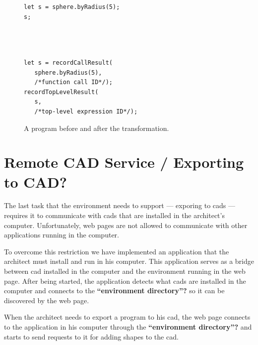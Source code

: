 \begin{figure}
  \centering
\begin{minipage}[t]{0.45\linewidth}
  \begin{verbatim}
let s = sphere.byRadius(5);
s;




  \end{verbatim}
\end{minipage}
\hspace{0.05\linewidth}
\begin{minipage}[t]{0.45\linewidth}
  \begin{verbatim}
let s = recordCallResult(
   sphere.byRadius(5),
   /*function call ID*/);
recordTopLevelResult(
   s,
   /*top-level expression ID*/);
  \end{verbatim}
\end{minipage}
  \caption{A program before and after the transformation.}
  \label{fig:instrument:example}
\end{figure}




\section{Remote CAD Service / Exporting to CAD?}
The last task that the environment needs to support --- exporing to \glspl{cad} --- requires it to communicate with \glspl{cad} that are installed in the architect's computer.
Unfortunately, web pages are not allowed to communicate with other applications running in the computer.

To overcome this restriction we have implemented an application that the architect must install and run in his computer.
This application serves as a bridge between \gls{cad} installed in the computer and the environment running in the web page.
After being started, the application detects what \glspl{cad} are installed in the computer and connects to the {\bf``environment directory''?} so it can be discovered by the web page.

When the architect needs to export a program to his \gls{cad}, the web page connects to the application in his computer through the {\bf``environment directory''?} and starts to send requests to it for adding shapes to the \gls{cad}.

